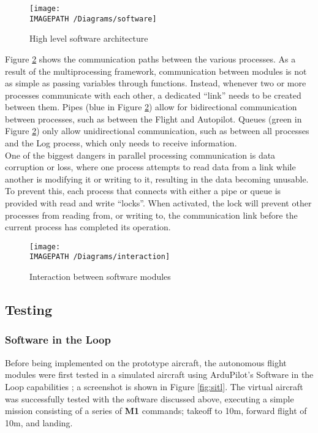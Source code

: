 \begin{figure}[!ht]
	\centering
	\texttt{[image: \\IMAGEPATH /Diagrams/software]}
	\caption{High level software architecture}
	\label{fig:softwarearchitecture}
\end{figure}

Figure \ref{fig:softwareinteraction} shows the communication paths between the various processes. As a result of the multiprocessing framework, communication between modules is not as simple as passing variables through functions. Instead, whenever two or more processes communicate with each other, a dedicated ``link'' needs to be created between them. Pipes (blue in Figure \ref{fig:softwareinteraction}) allow for bidirectional communication between processes, such as between the Flight and Autopilot. Queues (green in Figure \ref{fig:softwareinteraction}) only allow unidirectional communication, such as between all processes and the Log process, which only needs to receive information.\\

One of the biggest dangers in parallel processing communication is data corruption or loss, where one process attempts to read data from a link while another is modifying it or writing to it, resulting in the data becoming unusable. To prevent this, each process that connects with either a pipe or queue is provided with read and write ``locks''. When activated, the lock will prevent other processes from reading from, or writing to, the communication link before the current process has completed its operation.

\begin{figure}[H]
	\centering
	\texttt{[image: \\IMAGEPATH /Diagrams/interaction]}
	\caption{Interaction between software modules}
	\label{fig:softwareinteraction}
\end{figure}

\subsection{Testing}
\subsubsection*{Software in the Loop}
Before being implemented on the prototype aircraft, the autonomous flight modules were first tested in a simulated aircraft using ArduPilot's Software in the Loop capabilities \cite{ref:sitl}; a screenshot is shown in Figure \ref{fig:sitl}. The virtual aircraft was successfully tested with the software discussed above, executing a simple mission consisting of a series of \textbf{M1} commands; takeoff to 10m, forward flight of 10m, and landing.

